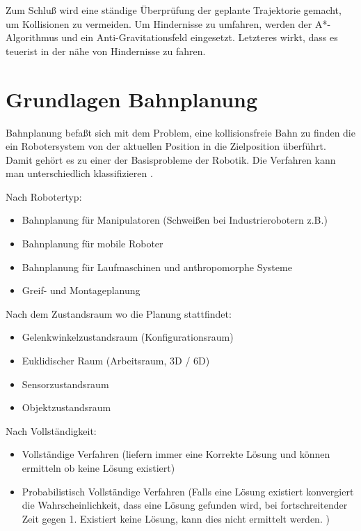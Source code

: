 Zum Schluß wird eine ständige Überprüfung der geplante Trajektorie gemacht, um Kollisionen zu vermeiden.
Um Hindernisse zu umfahren, werden der A*-Algorithmus und ein Anti-Gravitationsfeld eingesetzt.
Letzteres wirkt, dass es \glqq teuer\grqq \space ist in der nähe von Hindernisse zu fahren.



\section{Grundlagen Bahnplanung}
\label{bahnplanung_grundlagen_sec}
\authorsection{\editoroier}

Bahnplanung befaßt sich mit dem Problem, eine kollisionsfreie Bahn zu finden die  ein Robotersystem
von der aktuellen Position in die Zielposition überführt. Damit gehört es zu einer der Basisprobleme der Robotik. Die Verfahren kann man unterschiedlich klassifizieren \cite{rob1}.

Nach Robotertyp:
\begin{itemize}
\item Bahnplanung für Manipulatoren (Schweißen bei Industrierobotern z.B.)
\item Bahnplanung für mobile Roboter
\item Bahnplanung für Laufmaschinen und anthropomorphe Systeme
\item Greif- und Montageplanung
\end{itemize}

Nach dem Zustandsraum wo die Planung stattfindet:
\begin{itemize}
\item Gelenkwinkelzustandsraum (Konfigurationsraum)
\item Euklidischer Raum (Arbeitsraum, 3D / 6D)
\item Sensorzustandsraum
\item Objektzustandsraum
\end{itemize}

Nach Vollständigkeit:
\begin{itemize}
\item Vollständige Verfahren (liefern immer eine Korrekte Lösung und können ermitteln ob keine Lösung existiert)
\item Probabilistisch Vollständige Verfahren (Falls eine Lösung existiert konvergiert die Wahrscheinlichkeit, dass eine Lösung gefunden wird, bei fortschreitender Zeit gegen 1. Existiert keine Lösung, kann dies nicht ermittelt werden.
)
\end{itemize}

